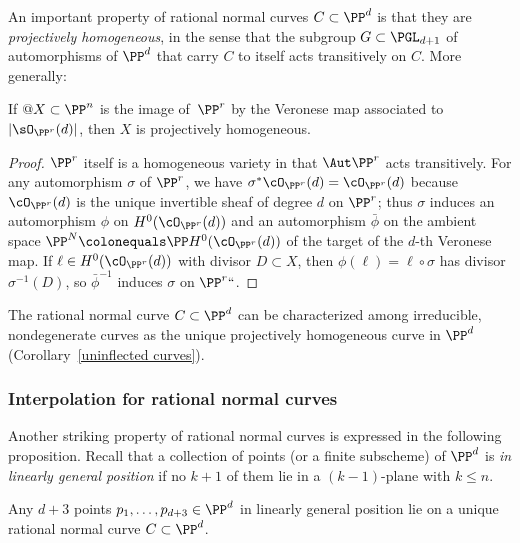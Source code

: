 An
important property of rational normal curves $C \subset \PP^d$
is that they are \emph{projectively homogeneous},
in the sense that the
subgroup $G\subset\PGL_{d+1}$ of automorphisms of $\PP^d$ that carry
$C$ to itself acts transitively on $C$. More generally:
%

\begin{proposition}\label{Veronese is projectively homogeneous}
If $@X\subset \PP^n$ is the image of $\,\PP^r$ by the Veronese map
%
associated
to $|\sO_{\PP^r}(d)|$, then $X$ is projectively homogeneous.
\unif
\end{proposition}

\begin{proof}
$\PP^r$
itself
is a homogeneous variety
in that $\Aut \PP^r$ acts transitively.
For any
automorphism
$\sigma$ of $\PP^r$, we have
$\sigma^*\cO_{\PP^r}(d) = \cO_{\PP^r}(d)$
because $\cO_{\PP^r}(d)$ is the unique
invertible sheaf of degree $d$ on $\PP^r$;
thus
$\sigma$ induces an automorphism $\phi$ on $H^0(\cO_{\PP^r}(d))$
and an automorphism $\bar \phi$ on the ambient space
$\PP^{N} \colonequals \PP H^0(\cO_{\PP^r}(d))$ of the target of the $d$-th Veronese map. If $\ell \in H^0(\cO_{\PP^r}(d))$
 with divisor $D\subset X$, then $\phi(\ell) = \ell \circ \sigma$ has divisor $\sigma^{-1}(D)$, so $\bar\phi^{-1}$ induces $\sigma$ on $\PP^r` `$.
\unif
\end{proof}

The
rational normal curve
%
$C \subset \PP^d$ can  be characterized among irreducible,
nondegenerate curves as the unique projectively homogeneous curve in
$\PP^d$ (Corollary~\ref{uninflected curves}).

\subsubsection*{%
Interpolation
for rational normal curves}
%

Another
striking
property of rational normal curves is expressed in
the following
proposition.
Recall that a collection of points (or a finite subscheme)
of $\PP^d$ is
\emph{in linearly general position}
if no $k{+}1$ of them lie in a $(k{-}1)$-plane with $k\leq n$.

\begin{proposition}\label{points on rnc}
%
Any $d+3$ points $p_1,\dots, p_{d+3} \in \PP^d$
in linearly general position
lie on a unique rational normal curve $C \subset \PP^d$.
\unif
 \end{proposition}

